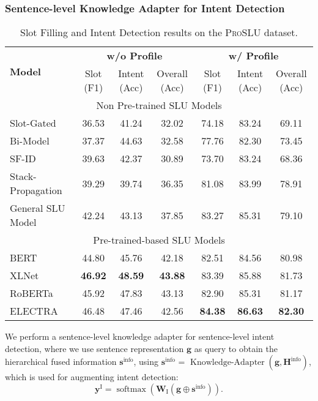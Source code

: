 \documentclass[letterpaper]{article} \usepackage{aaai22}  \usepackage{times}  \usepackage{helvet}  \usepackage{courier}  \usepackage[hyphens]{url}  \usepackage{graphicx} \urlstyle{rm} \def\UrlFont{\rm}  \usepackage{natbib}  \usepackage{caption} \DeclareCaptionStyle{ruled}{labelfont=normalfont,labelsep=colon,strut=off} \frenchspacing  \setlength{\pdfpagewidth}{8.5in}  \setlength{\pdfpageheight}{11in}  \usepackage{algorithm}
\begin{document}
\subsubsection{Sentence-level Knowledge Adapter for Intent Detection}
\begin{table*}[ht]
	\centering
	\begin{adjustbox}{width=0.95\textwidth}
		\begin{tabular}{l|c|c|c|c|c|c}
			\hline \hline
			\multirow{2}{*}{\textbf{Model}} & \multicolumn{3}{c|}{\textbf{w/o Profile}}& \multicolumn{3}{c}{\textbf{w/ Profile}}\\ \cline{2-7}
			& {Slot (F1)}  & {Intent (Acc)}   & {Overall (Acc)} & {Slot (F1)}  & {Intent (Acc)}   & {Overall (Acc)} \\ 
			\hline 
			\multicolumn{7}{c}{Non Pre-trained SLU Models} \\
			\hline
			Slot-Gated~\citep{goo-etal-2018-slot} & 36.53 & 41.24 & 32.02 & 74.18 & 83.24 & 69.11 \\
			Bi-Model~\citep{wang-etal-2018-bi}& 37.37 & 44.63 & 32.58 & 77.76 & 82.30 & 73.45 \\
			SF-ID~\citep{e-etal-2019-novel} & 39.63 & 42.37 & 30.89 & 73.70 & 83.24 & 68.36 \\
			Stack-Propagation~\citep{qin-etal-2019-stack} & 39.29 & 39.74 & 36.35 & 81.08 & 83.99 & 78.91 \\
			General SLU Model & 42.24 & 43.13 & 37.85 & 83.27 & 85.31 & 79.10 \\
			\hline 
            \multicolumn{7}{c}{Pre-trained-based SLU Models} \\
            \hline
			BERT~\citep{devlin-etal-2019-bert} & 44.80 & 45.76 & 42.18 & 82.51 & 84.56 & 80.98 \\
			XLNet~\citep{yang2019xlnet} & \textbf{46.92} & \textbf{48.59} & \textbf{43.88} & 83.39 & 85.88 & 81.73 \\
			RoBERTa~\citep{liu2019roberta} & 45.92 & 47.83 & 43.13 & 82.90 & 85.31 & 81.17 \\
			ELECTRA~\citep{clark2020electra} & 46.48 & 47.46 & 42.56 & \textbf{84.38} & \textbf{86.63} & \textbf{82.30} \\
            \hline \hline
		\end{tabular}
	\end{adjustbox}
	\caption{
		Slot Filling and Intent Detection results on the \textsc{ProSLU} dataset.
	}
	\label{tab:results}
\end{table*}

We perform a sentence-level knowledge adapter for sentence-level intent detection, where we use sentence representation $\mathbf{g}$ as query to obtain the hierarchical fused information $\mathbf{s}^\text{info}$, using $\mathbf{s}^\text{info}$ = $\operatorname{Knowledge-Adapter} (\mathbf{g}, \mathbf{H}^{\text{info}})$, which is used for augmenting intent detection:
\begin{equation}
    {\mathbf{y}}^{\mathrm{I}} = \operatorname{softmax}\left({\mathbf{W}}_{\mathrm{I}}\left( \mathbf{g} \oplus \mathbf{s}^\text{info} \right) \right).
\end{equation}
\end{document}
